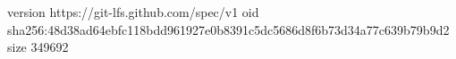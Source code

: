 version https://git-lfs.github.com/spec/v1
oid sha256:48d38ad64ebfc118bdd961927e0b8391c5dc5686d8f6b73d34a77c639b79b9d2
size 349692
